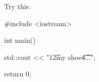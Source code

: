 \begin{console}[commandchars=\~\!\@]
Try this:
\begin{console}
#include <iostream>

int main()
{
    std::cout << "1\t2\tbuckle my shoe\t4\t...\n";

    return 0;
}
\end{console}

\begin{comment}
The \verb!'\t'! move the print cursor to the next tab position. 
\verb!'\t'! is also a character. 
It's called the \textbf{tab character}.

Special characters like the above (the newline and the tab characters) are not printable and so we have to use some special notation to say 
\lq\lq the newline character'' or the 
\lq\lq the tab character''. 
Computer scientists decided (long time ago) to use 
\verb!\! to indicate a special character. 
These are called \textbf{escape characters}.

Now recall that \verb!"! is used to mark the beginning and end of a string. What if you want to print something like this:
\[
	\texttt{.....".....}
\]
Try this:
\begin{console}
#include <iostream>

int main()
{
    std::cout << ".....".....";

    return 0;
}
\end{console}
Doesn't work right? Do you see why?

Now try this:
\begin{console}
#include <iostream>

int main()
{
    std::cout << "He shouted, \"42!\"\n";

    return 0;
}
\end{console}

So in a string, \verb!\"! will let you print \verb!"!. 

\verb!'\"'! is actually a character. 
There are two \verb!'\"'! characters in the above string  
\verb@"He shouted, \"42!\"\n"@.


\begin{ex}
Write a program that prints this:
\begin{console}
She said, "I would rather marry a pig."
\end{console}
\qed
\end{ex}

\begin{ex}
Write a program that prints this:
Here's a standard formula:
\begin{console}
       2      2          2
(x + y)   =  x  + 2xy + y
\end{console}
There are two \verb!' '! characters on each side of the 
\verb!'='! character.
\qed
\end{ex}



\end{comment}
\end{console}
